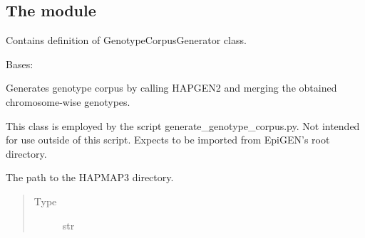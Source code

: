 \documentclass[a4paper,10pt,english]{sphinxhowto}
\begin{document}
\subsection{The module }
\label{\detokenize{utils:module-utils.genotype_corpus_generator}}\label{\detokenize{utils:the-module-utils-genotype-corpus-generator-py}}
Contains definition of GenotypeCorpusGenerator class.

\begin{fulllineitems}
\label{\detokenize{utils:utils.genotype_corpus_generator.GenotypeCorpusGenerator}}
Bases: 

Generates genotype corpus by calling HAPGEN2 and merging the obtained chromosome-wise genotypes.

This class is employed by the script generate\_genotype\_corpus.py.
Not intended for use outside of this script.
Expects to be imported from EpiGEN’s root directory.

\begin{fulllineitems}
\label{\detokenize{utils:utils.genotype_corpus_generator.GenotypeCorpusGenerator.hapmap_dir}}
The path to the HAPMAP3 directory.
\begin{quote}\begin{description}
\item[{Type}] \leavevmode
str

\end{description}\end{quote}

\end{fulllineitems}



\end{fulllineitems}
\end{document}
